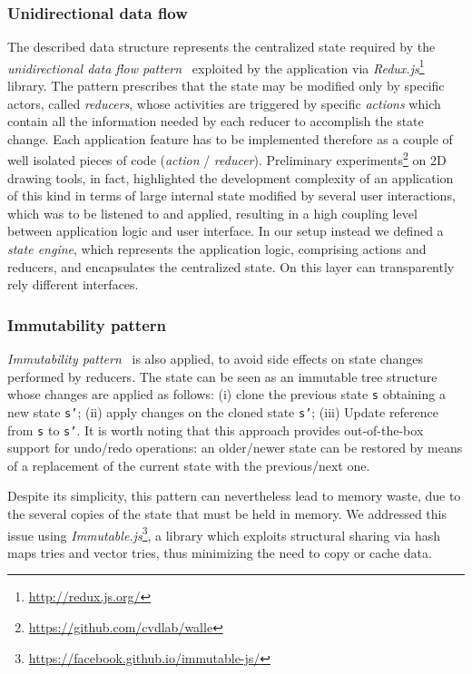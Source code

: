 \subsubsection*{Unidirectional data flow} The described data structure represents the centralized state required by the \emph{unidirectional data flow pattern}~\cite{CITARE QUALCOSA} exploited by the application via \emph{Redux.js}\footnote{\url{http://redux.js.org/}} library. The pattern prescribes that the state may be modified only by specific actors, called \emph{reducers}, whose activities are triggered by specific \emph{actions} which contain all the information needed by each reducer to accomplish the state change. Each application feature has to be implemented therefore as a couple of well isolated pieces of code (\emph{action} / \emph{reducer}). Preliminary experiments\footnote{\url{https://github.com/cvdlab/walle}} on 2D drawing tools, in fact, highlighted the development complexity of an application of this kind in terms of large internal state modified by several user interactions, which was to be listened to and applied, resulting in a high coupling level between application logic and user interface. In our setup instead we defined a \emph{state engine}, which represents the application logic, comprising actions and reducers, and encapsulates the centralized state. On this layer can transparently rely different interfaces.


\subsubsection*{Immutability pattern} \emph{Immutability pattern}~\cite{CITARE QUALCOSA} is also applied, to avoid side effects on state changes performed by reducers. The state can be seen as an immutable tree structure whose changes are applied as follows: (i) clone the previous state \texttt{s} obtaining a new state \texttt{s'}; (ii) apply changes on the cloned state \texttt{s'}; (iii) Update reference from \texttt{s} to \texttt{s'}. It is worth noting that this approach provides out-of-the-box support for undo/redo operations: an older/newer state can be restored by means of a replacement of the current state with the previous/next one.


Despite its simplicity, this pattern can nevertheless lead to memory waste, due to the several copies of the state that must be held in memory. We addressed this issue using \emph{Immutable.js}\footnote{\url{https://facebook.github.io/immutable-js/}}, a library which exploits structural sharing via hash maps tries and vector tries, thus minimizing the need to copy or cache data.



